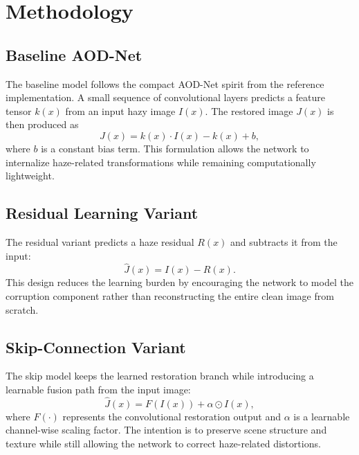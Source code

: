 \documentclass[conference]{IEEEtran}
\begin{document}
\section{Methodology}
\subsection{Baseline AOD-Net}
The baseline model follows the compact AOD-Net spirit from the reference implementation. A small sequence of convolutional layers predicts a feature tensor \(k(x)\) from an input hazy image \(I(x)\). The restored image \(J(x)\) is then produced as
\begin{equation}
    J(x) = k(x)\cdot I(x) - k(x) + b,
\end{equation}
where \(b\) is a constant bias term. This formulation allows the network to internalize haze-related transformations while remaining computationally lightweight.

\subsection{Residual Learning Variant}
The residual variant predicts a haze residual \(R(x)\) and subtracts it from the input:
\begin{equation}
    \hat{J}(x) = I(x) - R(x).
\end{equation}
This design reduces the learning burden by encouraging the network to model the corruption component rather than reconstructing the entire clean image from scratch.

\subsection{Skip-Connection Variant}
The skip model keeps the learned restoration branch while introducing a learnable fusion path from the input image:
\begin{equation}
    \hat{J}(x) = F(I(x)) + \alpha \odot I(x),
\end{equation}
where \(F(\cdot)\) represents the convolutional restoration output and \(\alpha\) is a learnable channel-wise scaling factor. The intention is to preserve scene structure and texture while still allowing the network to correct haze-related distortions.
\end{document}
